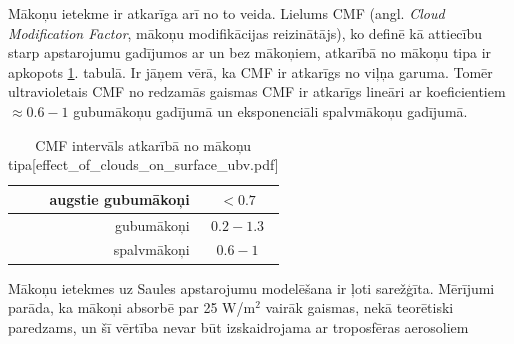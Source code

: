 Mākoņu ietekme ir atkarīga arī no to veida. Lielums CMF (angl. \textit{Cloud Modification Factor}, mākoņu modifikācijas reizinātājs), ko definē kā attiecību starp apstarojumu gadījumos ar un bez mākoņiem, atkarībā no mākoņu tipa ir apkopots \ref{tab:CMF}. tabulā. Ir jāņem vērā, ka CMF ir atkarīgs no viļņa garuma. Tomēr ultravioletais CMF no redzamās gaismas CMF ir atkarīgs lineāri ar koeficientiem $\approx0.6-1$ gubumākoņu gadījumā un eksponenciāli spalvmākoņu gadījumā.
\begin{table}[h]
	\caption{CMF intervāls atkarībā no mākoņu tipa[effect\_of\_clouds\_on\_surface\_ubv.pdf]}
	\begin{center}
		\begin{tabular}{| r | c |}
			\hline
			augstie gubumākoņi & $<0.7$     \\ \hline
			gubumākoņi         & $0.2-1.3$ \\ \hline
			spalvmākoņi        & $0.6-1$    \\ \hline
		\end{tabular}
	\end{center}
	\label{tab:CMF}
\end{table}

Mākoņu ietekmes uz Saules apstarojumu modelēšana ir ļoti sarežģīta. Mērījumi parāda, ka mākoņi absorbē par 25 W/m$^2$ vairāk gaismas, nekā teorētiski paredzams, un šī vērtība nevar būt izskaidrojama ar troposfēras aerosoliem

